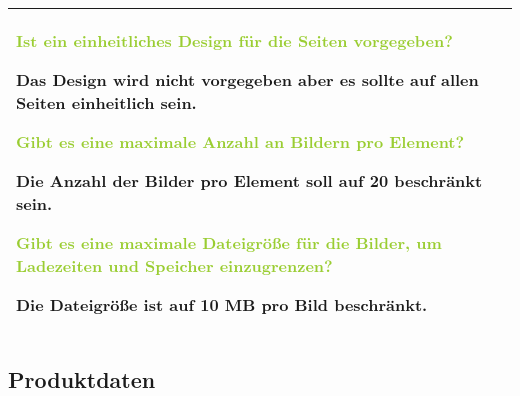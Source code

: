 \begin{tabular}[ht] {l | p{13cm}}
    \textcolor{YellowGreen}{Ist ein einheitliches Design für die Seiten vorgegeben?}

    \textcolor{NavyBlue}{Das Design wird nicht vorgegeben aber es sollte auf allen Seiten einheitlich sein.}

    \textcolor{YellowGreen}{Gibt es eine maximale Anzahl an Bildern pro Element?}

    \textcolor{NavyBlue}{Die Anzahl der Bilder pro Element soll auf 20 beschränkt sein.}

    \textcolor{YellowGreen}{Gibt es eine maximale Dateigröße für die Bilder, um Ladezeiten und Speicher einzugrenzen?}

    \textcolor{NavyBlue}{Die Dateigröße ist auf 10 MB pro Bild beschränkt.}
    \\
    \hline
\end{tabular}

\subsection{Produktdaten}

